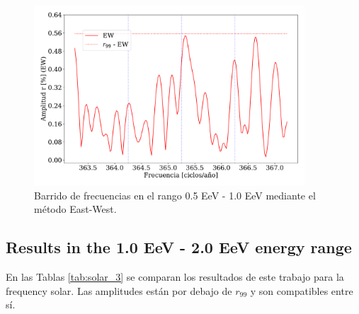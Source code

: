 \documentclass[12pt, doublespace, oneside]{article}
\begin{document}
    


    \begin{figure}[H]
        \begin{small}
            \begin{center}
                \vspace*{-1.6 cm}
                \includegraphics[width=0.9\textwidth]{Figs/plot_bin_2_barrido_v3_EW.pdf}
                \vspace*{-0.6 cm}
            \end{center}
            \caption{Barrido de frecuencias en el  rango 0.5 EeV - 1.0 EeV mediante el método East-West.}
            \label{fig:segundo_barrido}
        \end{small}
    \end{figure}    

\subsection{Results in the 1.0 EeV - 2.0 EeV energy range}
 
En las Tablas \ref{tab:solar_3}  se comparan los resultados de este trabajo  para la frequency solar. Las amplitudes están por debajo de $r_{99}$ y son compatibles entre sí.
\end{document}
